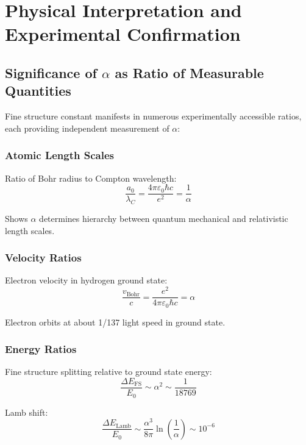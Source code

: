\documentclass[12pt,a4paper]{article}
\theoremstyle{definition}
\begin{document}
	\section{Physical Interpretation and Experimental Confirmation}
	
	\subsection{Significance of $\alpha$ as Ratio of Measurable Quantities}
	
	Fine structure constant manifests in numerous experimentally accessible ratios, each providing independent measurement of $\alpha$:
	
	\subsubsection{Atomic Length Scales}
	
	Ratio of Bohr radius to Compton wavelength:
	\begin{equation}
		\frac{a_0}{\lambda_C} = \frac{4\pi\varepsilon_0\hbar c}{e^2} = \frac{1}{\alpha}
	\end{equation}
	
	Shows $\alpha$ determines hierarchy between quantum mechanical and relativistic length scales.
	
	\subsubsection{Velocity Ratios}
	
	Electron velocity in hydrogen ground state:
	\begin{equation}
		\frac{v_{\text{Bohr}}}{c} = \frac{e^2}{4\pi\varepsilon_0\hbar c} = \alpha
	\end{equation}
	
	Electron orbits at about 1/137 light speed in ground state.
	
	\subsubsection{Energy Ratios}
	
	Fine structure splitting relative to ground state energy:
	\begin{equation}
		\frac{\Delta E_{\text{FS}}}{E_0} \sim \alpha^2 \sim \frac{1}{18769}
	\end{equation}
	
	Lamb shift:
	\begin{equation}
		\frac{\Delta E_{\text{Lamb}}}{E_0} \sim \frac{\alpha^3}{8\pi} \ln\left(\frac{1}{\alpha}\right) \sim 10^{-6}
	\end{equation}
	
\end{document}

